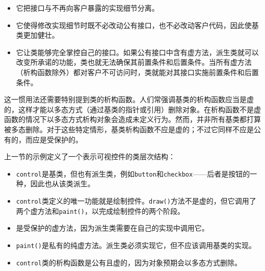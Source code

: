 
\begin{itemize}
\item 它把接口与不再向客户暴露的实现细节分离。



\item 它使得修改实现细节时既不必改动公有接口，也不必改动客户代码，因此使基类更加健壮。



\item 它让类能够完全掌控自己的接口。如果公有接口中含有虚方法，派生类就可以改变所承诺的功能，类也就无法确保其前置条件和后置条件。当所有虚方法（析构函数除外）都对客户不可访问时，类就能对其接口实施前置条件和后置条件。

\end{itemize}



这一惯用法还需要特别提到类的析构函数。人们常强调基类的析构函数应当是虚的，这样才能以多态方式（通过基类的指针或引用）删除对象。在析构函数不是虚函数的情况下以多态方式析构对象会造成未定义行为。然而，并非所有基类都打算被多态删除。对于这些特定情形，基类析构函数不应是虚的；不过它同样不应是公有的，而应是受保护的。



上一节的示例定义了一个表示可视控件的类层次结构：



\begin{itemize}
\item \texttt{control}是基类，但也有派生类，例如\texttt{button}和\texttt{checkbox}——后者是按钮的一种，因此也从该类派生。



\item \texttt{control}类定义的唯一功能就是绘制控件。\texttt{draw()}方法不是虚的，但它调用了两个虚方法和\texttt{paint()}，以完成绘制控件的两个阶段。



\item {}是受保护的虚方法，因为派生类需要在自己的实现中调用它。



\item \texttt{paint()}是私有的纯虚方法。派生类必须实现它，但不应该调用基类的实现。



\item \texttt{control}类的析构函数是公有且虚的，因为对象预期会以多态方式删除。

\end{itemize}


